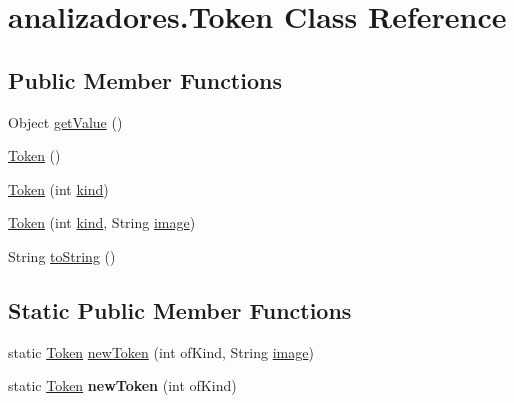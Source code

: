 \hypertarget{classanalizadores_1_1_token}{}\section{analizadores.\+Token Class Reference}
\label{classanalizadores_1_1_token}
\subsection*{Public Member Functions}
\begin{DoxyCompactItemize}
\item 
Object \mbox{\hyperlink{classanalizadores_1_1_token_ac7dec28cd30fc7fe1e678d8aec55008d}{get\+Value}} ()
\item 
\mbox{\hyperlink{classanalizadores_1_1_token_afe5ae37eb50ea338fa7159207f58ace9}{Token}} ()
\item 
\mbox{\hyperlink{classanalizadores_1_1_token_aeb457a7f26dda041155527fecbc475b6}{Token}} (int \mbox{\hyperlink{classanalizadores_1_1_token_ac5615b76c325a751915025aa28a03cfc}{kind}})
\item 
\mbox{\hyperlink{classanalizadores_1_1_token_a7691eebbf98eb55d3c338cb8d7dfccd6}{Token}} (int \mbox{\hyperlink{classanalizadores_1_1_token_ac5615b76c325a751915025aa28a03cfc}{kind}}, String \mbox{\hyperlink{classanalizadores_1_1_token_a3636b082aca90dcbd24df1790f847590}{image}})
\item 
String \mbox{\hyperlink{classanalizadores_1_1_token_a6b1216eeaff66da8354424d684fe0eb2}{to\+String}} ()
\end{DoxyCompactItemize}
\subsection*{Static Public Member Functions}
\begin{DoxyCompactItemize}
\item 
static \mbox{\hyperlink{classanalizadores_1_1_token}{Token}} \mbox{\hyperlink{classanalizadores_1_1_token_aca2ccbc7bd267f4098be9f4a0b07fc47}{new\+Token}} (int of\+Kind, String \mbox{\hyperlink{classanalizadores_1_1_token_a3636b082aca90dcbd24df1790f847590}{image}})
\item 
\mbox{\label{classanalizadores_1_1_token_ae617d54f335f4292715da074aa8a0abe}} 
static \mbox{\hyperlink{classanalizadores_1_1_token}{Token}} {\bfseries new\+Token} (int of\+Kind)
\end{DoxyCompactItemize}
